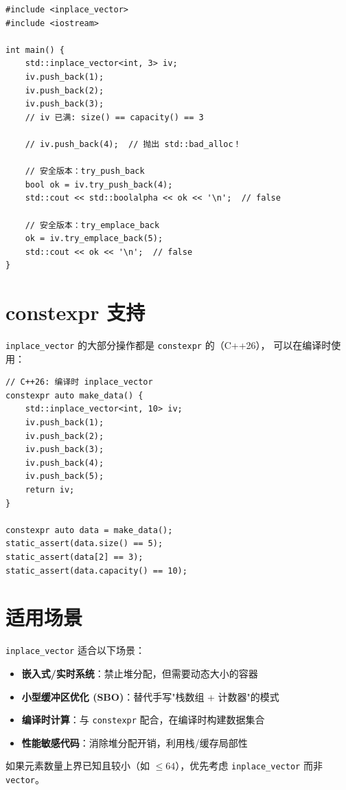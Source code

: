 \documentclass[12pt,a4paper,fontset=fandol]{ctexbook}
\newcommand{\cpp}[1]{C++#1}
\newcommand{\Tp}[1]{\texttt{#1}}
\begin{document}
\begin{lstlisting}
#include <inplace_vector>
#include <iostream>

int main() {
    std::inplace_vector<int, 3> iv;
    iv.push_back(1);
    iv.push_back(2);
    iv.push_back(3);
    // iv 已满: size() == capacity() == 3

    // iv.push_back(4);  // 抛出 std::bad_alloc！

    // 安全版本：try_push_back
    bool ok = iv.try_push_back(4);
    std::cout << std::boolalpha << ok << '\n';  // false

    // 安全版本：try_emplace_back
    ok = iv.try_emplace_back(5);
    std::cout << ok << '\n';  // false
}
\end{lstlisting}

\section{constexpr 支持}

\Tp{inplace\_vector} 的大部分操作都是 \texttt{constexpr} 的（\cpp{26}），
可以在编译时使用：

\begin{lstlisting}
// C++26: 编译时 inplace_vector
constexpr auto make_data() {
    std::inplace_vector<int, 10> iv;
    iv.push_back(1);
    iv.push_back(2);
    iv.push_back(3);
    iv.push_back(4);
    iv.push_back(5);
    return iv;
}

constexpr auto data = make_data();
static_assert(data.size() == 5);
static_assert(data[2] == 3);
static_assert(data.capacity() == 10);
\end{lstlisting}

\section{适用场景}

\begin{bestpractice}
\texttt{inplace\_vector} 适合以下场景：
\begin{itemize}
\item \textbf{嵌入式/实时系统}：禁止堆分配，但需要动态大小的容器
\item \textbf{小型缓冲区优化 (SBO)}：替代手写"栈数组 + 计数器"的模式
\item \textbf{编译时计算}：与 \texttt{constexpr} 配合，在编译时构建数据集合
\item \textbf{性能敏感代码}：消除堆分配开销，利用栈/缓存局部性
\end{itemize}
如果元素数量上界已知且较小（如 $\leq 64$），优先考虑 \texttt{inplace\_vector}
而非 \texttt{vector}。
\end{bestpractice}
\end{document}
